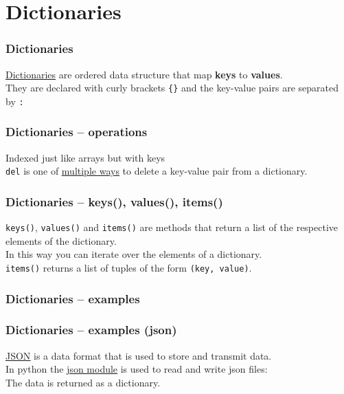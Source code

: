 \documentclass{beamer}
\newcommand{\hrefu}[2]{\underline{\href{#1}{#2}}}
\begin{document}
\section{Dictionaries}
\begin{frame}
  \frametitle{Dictionaries}
  \hrefu{https://www.w3schools.com/python/python\_dictionaries.asp}{Dictionaries} are ordered data structure that map \textbf{keys} to \textbf{values}.\\
  They are declared with curly brackets \texttt{\{\}} and the key-value pairs are separated by \texttt{:}\\
  
\end{frame}
\begin{frame}
  \frametitle{Dictionaries -- operations}
  Indexed just like arrays but with keys\\
  
  \texttt{del} is one of \hrefu{https://www.geeksforgeeks.org/python-ways-to-remove-a-key-from-dictionary/}{multiple ways} to delete a key-value pair from a dictionary.\\
\end{frame}
\begin{frame}
  \frametitle{Dictionaries -- keys(), values(), items()}
  \texttt{keys()}, \texttt{values()} and \texttt{items()} are methods that return a list of the respective elements of the dictionary.\\
    
  In this way you can iterate over the elements of a dictionary.\\
  \texttt{items()} returns a list of tuples of the form \texttt{(key, value)}.
\end{frame}
\begin{frame}
  \frametitle{Dictionaries -- examples}
    
\end{frame}
\begin{frame}
  \frametitle{Dictionaries -- examples (json)}
  \hrefu{https://de.wikipedia.org/wiki/JavaScript\_Object\_Notation}{JSON} is a data format that is used to store and transmit data.\\
  In python the \hrefu{https://docs.python.org/3/library/json.html}{json module} is used to read and write json files:\\
  
  The data is returned as a dictionary.
\end{frame}
\end{document}
